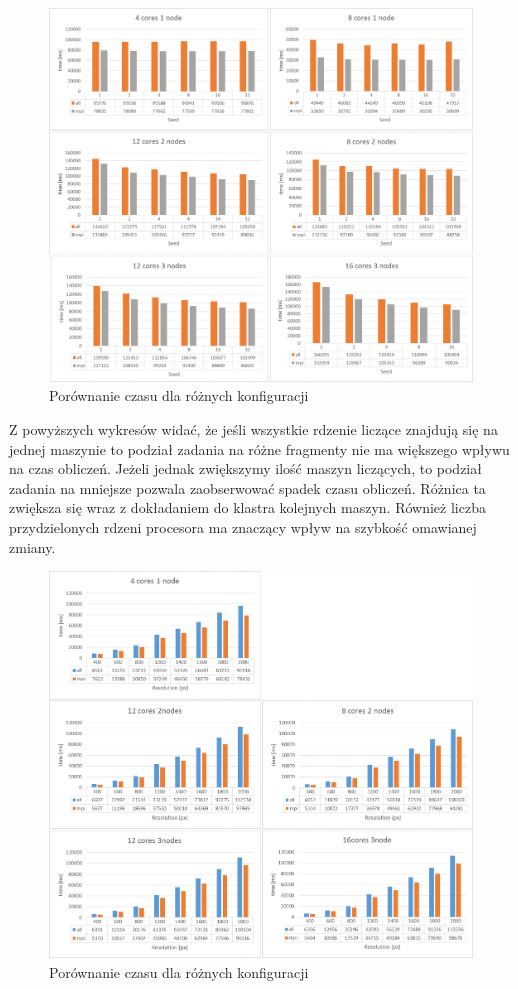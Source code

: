 \documentclass[a4paper]{article}
\begin{document}
\begin{figure}[H]
    \centering
    \includegraphics[width=\textwidth]{1.png}
    \caption{Porównanie czasu dla różnych konfiguracji}
    \label{fig:w1}
\end{figure}

Z powyższych wykresów widać, że jeśli wszystkie rdzenie liczące znajdują się na jednej maszynie to podział zadania na różne fragmenty nie ma większego wpływu na czas obliczeń. Jeżeli jednak zwiększymy ilość maszyn liczących, to podział zadania na mniejsze pozwala zaobserwować spadek czasu obliczeń. Różnica ta zwiększa się wraz z dokładaniem do klastra kolejnych maszyn. Również liczba przydzielonych rdzeni procesora ma znaczący wpływ na szybkość omawianej zmiany.

\begin{figure}[H]
    \centering
    \includegraphics[width=\textwidth]{2.png}
    \caption{Porównanie czasu dla różnych konfiguracji}
    \label{fig:w2}
\end{figure}
\end{document}
